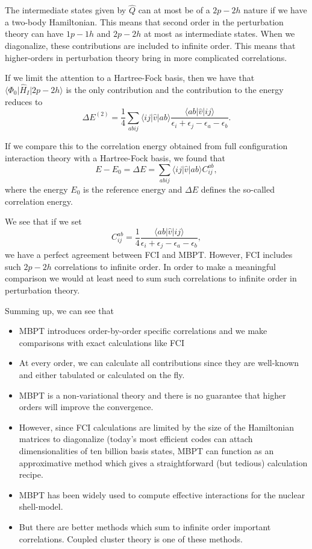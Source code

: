 The intermediate states given by $\hat{Q}$ can at most be of a $2p-2h$ nature if we have a two-body Hamiltonian. This means that second order in the perturbation theory can have $1p-1h$ and $2p-2h$ at most as intermediate states. When we diagonalize, these contributions are included to infinite order. This means that higher-orders in perturbation theory bring in more complicated correlations. 

If we limit the attention to a Hartree-Fock basis, then we have that
$\langle\Phi_0\vert \hat{H}_I \vert 2p-2h\rangle$ is the only contribution and the contribution to the energy reduces to
\[
\Delta E^{(2)}=\frac{1}{4}\sum_{abij}\langle ij\vert \hat{v}\vert ab\rangle \frac{\langle ab\vert \hat{v}\vert ij\rangle}{\epsilon_i+\epsilon_j-\epsilon_a-\epsilon_b}.
\]

If we compare this to the correlation energy obtained from full configuration interaction theory with a Hartree-Fock basis, we found that
\[
E-E_0 =\Delta E=
\sum_{abij}\langle ij | \hat{v}| ab \rangle C_{ij}^{ab},
\]
where the energy $E_0$ is the reference energy and $\Delta E$ defines the so-called correlation energy.

We see that if we set
\[
C_{ij}^{ab} =\frac{1}{4}\frac{\langle ab \vert \hat{v} \vert ij \rangle}{\epsilon_i+\epsilon_j-\epsilon_a-\epsilon_b},
\]
we have a perfect agreement between FCI and MBPT. However, FCI includes such $2p-2h$ correlations to infinite order. In order to make a meaningful comparison we would at least need to sum such correlations to infinite order in perturbation theory. 

Summing up, we can see that
\begin{itemize}
\item MBPT introduces order-by-order specific correlations and we make comparisons with exact calculations like FCI

\item At every order, we can calculate all contributions since they are well-known and either tabulated or calculated on the fly.

\item MBPT is a non-variational theory and there is no guarantee that higher orders will improve the convergence. 

\item However, since FCI calculations are limited by the size of the Hamiltonian matrices to diagonalize (today's most efficient codes can attach dimensionalities of ten billion basis states, MBPT can function as an approximative method which gives a straightforward (but tedious) calculation recipe. 

\item MBPT has been widely used to compute effective interactions for the nuclear shell-model.

\item But there are better methods which sum to infinite order important correlations. Coupled cluster theory is one of these methods. 
\end{itemize}

